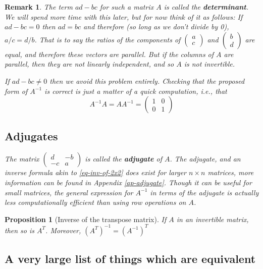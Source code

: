 \documentclass[12pt]{article}
\numberwithin{equation}{subsection}
\numberwithin{figure}{subsection}
\newtheorem{prop}[subsection]{Proposition}
\theoremstyle{note}
\newtheorem{remark}[subsection]{Remark}
\begin{document}
\begin{remark} The term $ad-bc$ for such a matrix $A$ is called the \textbf{determinant}. We will spend more time with this later, but for now think of it as follows: If $ad-bc=0$ then $ad=bc$ and therefore (so long as we don't divide by 0), $a/c=d/b$. That is to say the ratios of the components of $\begin{pmatrix}a \\ c \end{pmatrix}$ and $\begin{pmatrix} b \\ d\end{pmatrix}$ are equal, and therefore these vectors are parallel. But if the columns of $A$ are parallel, then they are not linearly independent, and so $A$ is not invertible. 


If $ad-bc\neq0$ then we avoid this problem entirely. Checking that the proposed form of $A^{-1}$ is correct is just a matter of a quick computation, i.e., that  \[ A^{-1}A=AA^{-1}=\begin{pmatrix} 1 & 0 \\ 0 & 1\end{pmatrix} \]

\subsection{Adjugates}
The matrix $\begin{pmatrix} d & -b \\ -c & a\end{pmatrix}$ is called the \textbf{adjugate} of $A$. The adjugate, and an inverse formula akin to \eqref{eq-inv-of-2x2} does exist for larger $n\times n$ matrices, more information can be found in Appendix \ref{ap-adjugate}. Though it can be useful for small matrices, the general expression for $A^{-1}$ in terms of the adjugate is actually \textit{less} computationally efficient than using row operations on $A$.
\end{remark}

\begin{prop}[Inverse of the transpose matrix]\label{prop-transpose-inv} 
	If $A$ in an invertible matrix, then so is $A^T$. Moreover, $(A^T)^{-1}=(A^{-1})^T$
\end{prop}

\subsection{A very large list of things which are equivalent}
\end{document}
